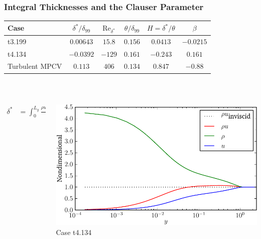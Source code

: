 \documentclass[mathserif]{beamer}
\begin{document}
\begin{frame}
\frametitle{Integral Thicknesses and the Clauser Parameter}
\centering
\begin{tabular}{lccccc}
Case                         &
$\delta^\ast/\delta_{99}$    &
$\textrm{Re}_{\delta^\ast}$  &
$\theta/\delta_{99}$         &
$H=\delta^\ast/\theta$       &
$\beta$
\\
\toprule
t3.199          &  \n$0.00643$   &  \n\z$15.8$    &  $0.156$  &  \n$0.0413$   &  $-0.0215$    \\
t4.134          &  $-0.0392$\z   &  $-129$\z      &  $0.161$  &  $-0.243$\z   &  \n$0.161$\z  \\
Turbulent MPCV  &  \n$0.113$\z\z &  \n$406$\z     &  $0.134$  &  \n$0.847$\n  &  $-0.88$\z\z
\end{tabular}
%
\\\vfill
%
\begin{columns}[c,onlytextwidth]
    \begin{column}{0.45\textwidth}
        \begin{align}
            \delta^\ast
        &=
            \int_0^{L_y} \frac{{\rho u}_\text{inviscid}  - {\rho u} }
                              {{\rho u}_\text{inviscid} } \, \mathrm{d}y
        \end{align}
        \\\vspace{2.5em}
    \end{column}
    \begin{column}{0.55\textwidth}
        \centering
        \includegraphics[width=\textwidth]{delta1weird}
        \\
        \small
        Case t4.134
    \end{column}
\end{columns}
\end{frame}
\end{document}
